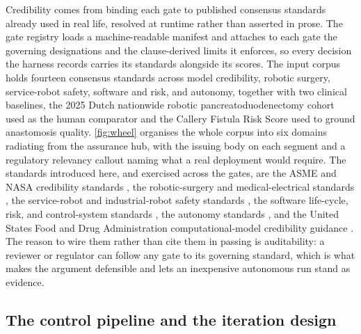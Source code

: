 Credibility comes from binding each gate to published consensus standards already
used in real life, resolved at runtime rather than asserted in prose. The gate
registry loads a machine-readable manifest and attaches to each gate the
governing designations and the clause-derived limits it enforces, so every
decision the harness records carries its standards alongside its scores. The
input corpus holds fourteen consensus standards across model credibility,
robotic surgery, service-robot safety, software and risk, and autonomy, together
with two clinical baselines, the 2025 Dutch nationwide robotic
pancreatoduodenectomy cohort used as the human comparator and the Callery Fistula
Risk Score used to ground anastomosis quality. \autoref{fig:wheel} organises the
whole corpus into six domains radiating from the assurance hub, with the issuing
body on each segment and a regulatory relevancy callout naming what a real
deployment would require. The standards introduced here, and exercised across the
gates, are the ASME and NASA credibility standards \cite{asmevv40, nasastd7009a},
the robotic-surgery and medical-electrical standards \cite{iec8060127, iec60601},
the service-robot and industrial-robot safety standards \cite{isots15066,
iso13482, iso10218, iso9283}, the software life-cycle, risk, and control-system
standards \cite{iec62304, iso14971, iso13849}, the autonomy standards
\cite{ul4600, ieee7009}, and the United States Food and Drug Administration
computational-model credibility guidance \cite{fda2023credibility}. The reason to
wire them rather than cite them in passing is auditability: a reviewer or
regulator can follow any gate to its governing standard, which is what makes the
argument defensible and lets an inexpensive autonomous run stand as evidence.

\subsection{The control pipeline and the iteration design}

